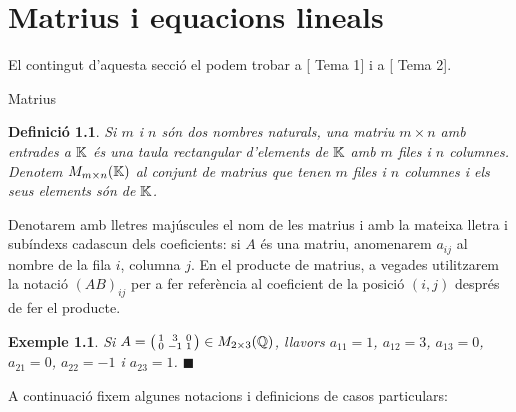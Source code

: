 \documentclass[
  11pt,
]{book}
\makeatletter
\numberwithin{dummy}{section}
\theoremstyle{maincolornumbox}
\theoremstyle{blacknumex}
\newtheorem{exampleT}{Exemple}[chapter]
\theoremstyle{blacknumbox}
\newtheorem{definitionT}{Definició}[chapter]
\theoremstyle{maincolornum}
\newenvironment{definition}{\begin{dBox}\begin{definitionT}}{\end{definitionT}\end{dBox}}
\newenvironment{example}{\begin{exampleT}}{\hfill{\tiny\ensuremath{\blacksquare}}\end{exampleT}}
\renewcommand{\section}{\@startsection{section}{1}{\z@}
{-4ex \@plus -1ex \@minus -.4ex}
{1ex \@plus.2ex }
{\normalfont\large\sffamily\bfseries}}
\newlength\esp
\makeatother
\begin{document}
\chapter{Matrius i equacions lineals}\label{matrius-i-equacions-lineals}

El contingut d'aquesta secció el podem trobar a {[} Tema 1{]} i a
{[} Tema 2{]}.

\section{Matrius}\label{matrius}

\begin{definition}
Si \(m\) i \(n\) són dos nombres naturals, una \emph{matriu \(m\times n\) amb
entrades a \(\mathbb{K}\)} és una taula rectangular d'elements de \(\mathbb{K}\) amb \(m\)
files i \(n\) columnes. Denotem \(M_{m\times n}(\mathbb{K})\) al conjunt de matrius
que tenen \(m\) files i \(n\) columnes i els seus elements són de \(\mathbb{K}\).
\end{definition}

Denotarem amb lletres majúscules el nom de les matrius i amb la mateixa
lletra i subíndexs cadascun dels coeficients: si \(A\) és una matriu,
anomenarem \(a_{ij}\) al nombre de la fila \(i\), columna \(j\). En el
producte de matrius, a vegades utilitzarem la notació \((AB)_{ij}\) per a
fer referència al coeficient de la posició \((i,j)\) després de fer el
producte.

\begin{example}
Si \(A=\big(\begin{smallmatrix}
    1 & 3 & 0 \\ 0 & -1 & 1
    \end{smallmatrix}\big) \in M_{2\times3}(\mathbb{Q})\), llavors \(a_{11}=1\),
\(a_{12}=3\), \(a_{13}=0\), \(a_{21}=0\), \(a_{22}=-1\) i \(a_{23}=1\).
\end{example}

A continuació fixem algunes notacions i definicions de casos
particulars:
\end{document}
